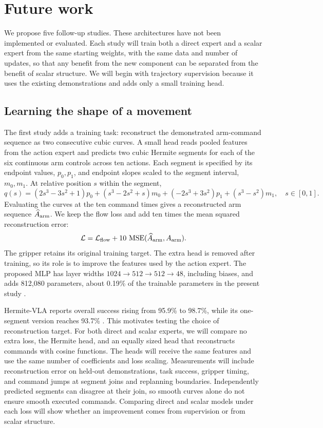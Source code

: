 \section{Future work}
\label{sec:future}
We propose five follow-up studies. These architectures have not been implemented or evaluated. Each study will train both a direct expert and a scalar expert from the same starting weights, with the same data and number of updates, so that any benefit from the new component can be separated from the benefit of scalar structure. We will begin with trajectory supervision because it uses the existing demonstrations and adds only a small training head.

\subsection{Learning the shape of a movement}
\label{sec:trajectory}
The first study adds a training task: reconstruct the demonstrated arm-command sequence as two consecutive cubic curves. A small head reads pooled features from the action expert and predicts two cubic Hermite segments for each of the six continuous arm controls across ten actions. Each segment is specified by its endpoint values, $p_0,p_1$, and endpoint slopes scaled to the segment interval, $m_0,m_1$. At relative position $s$ within the segment,
\begin{equation}
q(s)=(2s^3-3s^2+1)p_0+(s^3-2s^2+s)m_0+(-2s^3+3s^2)p_1+(s^3-s^2)m_1,
\quad s\in[0,1].
\end{equation}
Evaluating the curves at the ten command times gives a reconstructed arm sequence $\widehat A_{\rm arm}$. We keep the flow loss and add ten times the mean squared reconstruction error:
\begin{equation}
\mathcal L=\mathcal L_{\rm flow}+10\,\operatorname{MSE}(\widehat A_{\rm arm},A_{\rm arm}).
\end{equation}
The gripper retains its original training target. The extra head is removed after training, so its role is to improve the features used by the action expert. The proposed MLP has layer widths $1024\!\to\!512\!\to\!512\!\to\!48$, including biases, and adds 812,080 parameters, about 0.19\% of the trainable parameters in the present study \cite{lv2026hermitecode}.

Hermite-VLA reports overall success rising from 95.9\% to 98.7\%, while its one-segment version reaches 93.7\% \cite{lv2026hermite}. This motivates testing the choice of reconstruction target. For both direct and scalar experts, we will compare no extra loss, the Hermite head, and an equally sized head that reconstructs commands with cosine functions. The heads will receive the same features and use the same number of coefficients and loss scaling. Measurements will include reconstruction error on held-out demonstrations, task success, gripper timing, and command jumps at segment joins and replanning boundaries. Independently predicted segments can disagree at their join, so smooth curves alone do not ensure smooth executed commands. Comparing direct and scalar models under each loss will show whether an improvement comes from supervision or from scalar structure.

